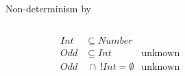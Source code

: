 \begin{frame}{Non-determinism by }
  \begin{columns}
    \begin{column}{0.35\textwidth}
      \centering
      
      \begin{align*}
        Int&\subseteq Number\\
        Odd&\subseteq Int &\text{unknown}\\
        Odd&~\cap~ !Int = \emptyset &\text{unknown}
      \end{align*}
      \scalebox{0.8}{}
    \end{column}%
    \begin{column}{0.7\textwidth}
      \only<1>{\scalebox{0.6}{}}%
    \end{column}
  \end{columns}

\end{frame}








\newsavebox\classbox
\begin{lrbox}{\classbox}
  \begin{minipage}{5cm}
    
  \end{minipage}
\end{lrbox}



